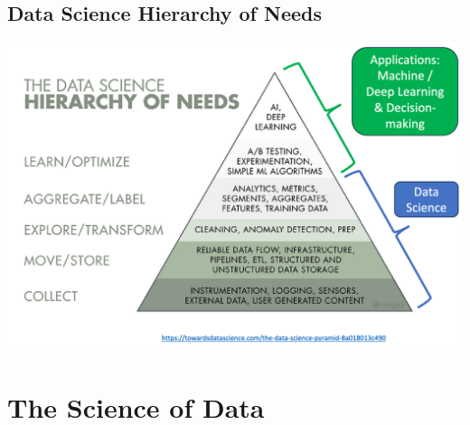 \documentclass[11pt]{article}
\theoremstyle{definition}
\begin{document}
\subsection{Data Science Hierarchy of Needs}
\includegraphics[width=\textwidth/2]{3.png}


\section{The Science of Data}
\end{document}
